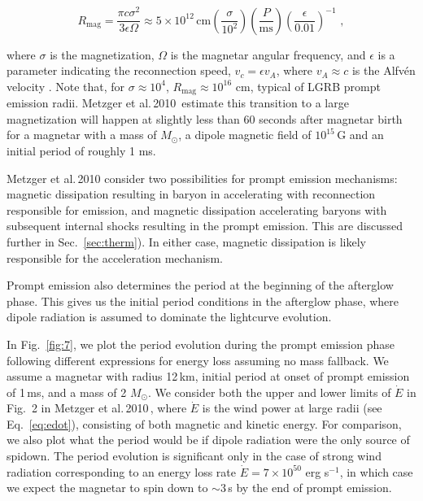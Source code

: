 \documentclass{article}
\begin{document}
\begin{equation}
  R_{\mathrm{mag}}=\frac{\pi c \sigma^2}{3 \epsilon \Omega}\approx 5 \times 10^{12}\, \mathrm{cm} \left(\frac{\sigma}{10^2}\right) \left(\frac{P}{\mathrm{ms}}\right)\left(\frac{\epsilon}{0.01}\right)^{-1}\,\,,
\end{equation}

where $\sigma$ is the magnetization, $\Omega$ is the magnetar angular frequency, and $\epsilon$ is a parameter indicating the reconnection speed, $v_c=\epsilon v_A$, where $v_A \approx c$ is the Alfv\'en velocity \cite{Metzger:2010pp}. Note that, for $\sigma\approx 10^4$, $R_{\mathrm{mag}} \approx 10^{16}$ cm, typical of LGRB prompt emission radii. Metzger et al.\,2010\,\cite{Metzger:2010pp} estimate this transition to a large magnetization will happen at slightly less than 60 seconds after magnetar birth for a magnetar with a mass of $M_{\odot}$, a dipole  magnetic field of $10^{15}$\,G and an initial period of roughly 1 ms.

Metzger et al.\,2010 \cite{Metzger:2010pp} consider two possibilities for prompt emission mechanisms: magnetic dissipation resulting in baryon in accelerating with reconnection responsible for emission, and magnetic dissipation accelerating baryons with subsequent internal shocks resulting in the prompt emission. This are discussed further in Sec.~\ref{sec:therm}). In either case, magnetic dissipation is likely responsible for the acceleration mechanism.

Prompt emission also determines the period at the beginning of the afterglow phase. This gives us the initial period conditions in the afterglow phase, where dipole radiation is assumed to dominate the lightcurve evolution. 

In Fig.~\ref{fig:7}, we plot the period evolution during the prompt emission phase following different expressions for energy loss assuming no mass fallback. We assume a magnetar with radius 12\,km, initial period at onset of prompt emission of 1\,ms, and a mass of 2 $M_{\odot}$. We consider both the upper and lower limits of $\dot{E}$ in Fig.~2 in Metzger et al.\,2010\,\cite{Metzger:2010pp}, where $\dot{E}$ is the wind power at large radii (see Eq.~\ref{eq:edot}), consisting of both magnetic and kinetic energy. For comparison, we also plot what the period would be if dipole radiation were the only source of spidown. The period evolution is significant only in the case of strong wind radiation corresponding to an energy loss rate $\dot{E} = 7 \times 10^{50}$ erg s$^{-1}$, in which case we expect the magnetar to spin down to $\sim 3$\,s by the end of prompt emission.
\end{document}
